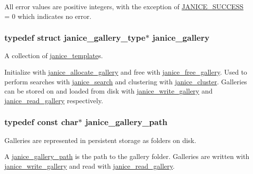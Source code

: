 All error values are positive integers, with the exception of \hyperlink{group__janice_gga4873d49c1f9d6a6880dfbd485cf6ba72a7cd6c7d28583c2dfa4e19f8642a60f3e}{J\+A\+N\+I\+C\+E\+\_\+\+S\+U\+C\+C\+E\+S\+S} = 0 which indicates no error. \hypertarget{group__janice_ga08feff1c2835b44332afeda80c3d0fb7}{}
\subsubsection[{janice\+\_\+gallery}]{\setlength{\rightskip}{0pt plus 5cm}typedef struct janice\+\_\+gallery\+\_\+type$\ast$ {\bf janice\+\_\+gallery}}\label{group__janice_ga08feff1c2835b44332afeda80c3d0fb7}


A collection of \hyperlink{group__janice_ga5593b06e86b90504968c0fc191ee2f3c}{janice\+\_\+template}s. 

Initialize with \hyperlink{group__janice_gad17bd59e58177b5f29f32f418ce77f71}{janice\+\_\+allocate\+\_\+gallery} and free with \hyperlink{group__janice_gad059b35e049028060025889a14fe6982}{janice\+\_\+free\+\_\+gallery}. Used to perform searches with \hyperlink{group__janice_ga073aa5f2133223c0b31ac3e78671836a}{janice\+\_\+search} and clustering with \hyperlink{group__janice_ga20d0206073850de0224651441c980ee7}{janice\+\_\+cluster}. Galleries can be stored on and loaded from disk with \hyperlink{group__janice_gaf6aa26be058ad0905d9a03d1798835be}{janice\+\_\+write\+\_\+gallery} and \hyperlink{group__janice_ga55130671c1d2a7fb607e96134d80da45}{janice\+\_\+read\+\_\+gallery} respectively. \hypertarget{group__janice_gac531556b0a1896b828209fe7fd843b90}{}
\subsubsection[{janice\+\_\+gallery\+\_\+path}]{\setlength{\rightskip}{0pt plus 5cm}typedef const char$\ast$ {\bf janice\+\_\+gallery\+\_\+path}}\label{group__janice_gac531556b0a1896b828209fe7fd843b90}


Galleries are represented in persistent storage as folders on disk. 

A \hyperlink{group__janice_gac531556b0a1896b828209fe7fd843b90}{janice\+\_\+gallery\+\_\+path} is the path to the gallery folder. Galleries are written with \hyperlink{group__janice_gaf6aa26be058ad0905d9a03d1798835be}{janice\+\_\+write\+\_\+gallery} and read with \hyperlink{group__janice_ga55130671c1d2a7fb607e96134d80da45}{janice\+\_\+read\+\_\+gallery}. \hypertarget{group__janice_ga3f20c208762563c88c414664c21d654e}{}
